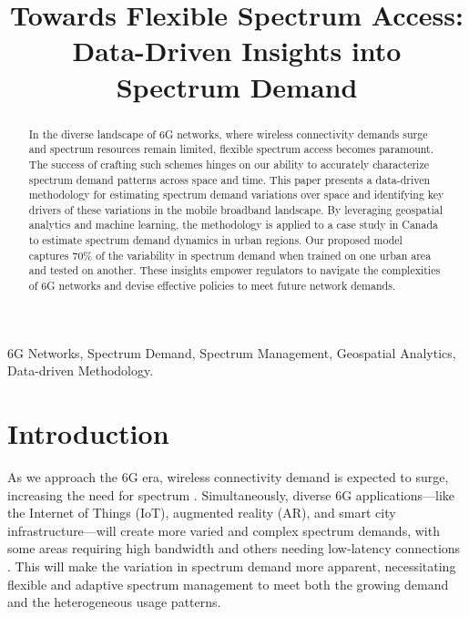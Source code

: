 \documentclass[conference]{IEEEtran}
\begin{document}
\title{Towards Flexible Spectrum Access: Data-Driven Insights into Spectrum Demand\\}


\author{
}


\maketitle

\begin{abstract}In the diverse landscape of 6G networks, where wireless connectivity demands surge and spectrum resources remain limited, flexible spectrum access becomes paramount. The success of crafting such schemes hinges on our ability to accurately characterize spectrum demand patterns across space and time. This paper presents a data-driven methodology for estimating spectrum demand variations over space and identifying key drivers of these variations in the mobile broadband landscape. By leveraging geospatial analytics and machine learning, the methodology is applied to a case study in Canada to estimate spectrum demand dynamics in urban regions. Our proposed model captures 70\% of the variability in spectrum demand when trained on one urban area and tested on another. These insights empower regulators to navigate the complexities of 6G networks and devise effective policies to meet future network demands.
\end{abstract}
\begin{IEEEkeywords}
6G Networks, Spectrum Demand, Spectrum Management, Geospatial Analytics, Data-driven Methodology.
\end{IEEEkeywords}

\section{Introduction}
\label{Introduction}
As we approach the 6G era, wireless connectivity demand is expected to surge, increasing the need for spectrum \cite{itu2015}. Simultaneously, diverse 6G applications—like the Internet of Things (IoT), augmented reality (AR), and smart city infrastructure—will create more varied and complex spectrum demands, with some areas requiring high bandwidth and others needing low-latency connections \cite{ofcom2021_spectrum_strategy, itu2023_gsr}. This will make the variation in spectrum demand more apparent, necessitating flexible and adaptive spectrum management to meet both the growing demand and the heterogeneous usage patterns.
\end{document}
